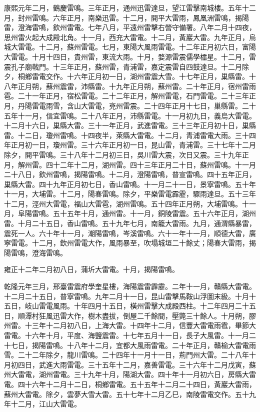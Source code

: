 \begin{pinyinscope}
康熙元年二月，鶴慶雷鳴。三年正月，通州迅雷達旦，望江雷擊南城樓。五年十二月，封州雷鳴。六年正月，南樂迅雷。十二月，開平大雷雨，鳳凰洲雷鳴，揭陽雷，澄海雷鳴，欽州雷電。七年八月，平遠州雷擊右營守備署。八年二月十四夜，思州雷火起大成殿北角。十一月，西充大雷電。十二月，黃巖大雷。九年正月，烏城大雷電。十二月，蘇州雷電。七月，東陽大風雨雷電。十二年正月初六日，富陽大雷電。十月十四日，貴州雷，東流大雨。十月，婺源雷震儒學櫺星。十二月，雷震孔子廟戟門。十三年正月，蘇州雷，青浦雷，嘉定震雷自四鼓達旦。十二月除夕，桐鄉雷電交作。十六年正月初一日，湖州雷震大雪。十七年正月，巢縣雷。十八年正月朔，蘇州震雷，沛縣雷。十九年正月朔，蘇州雷。二十年正月，宿州雷雨雹。二十一年正月，宿松雷電。二十二年正月，解州雷電，石門雷電。二十三年正月，丹陽雷電雨雪，含山大雷電，兗州雷震。二十四年正月十七日，巢縣雷。二十五年十一月，信宜雷鳴。二十八年正月，沛縣雷電。十一月初九日，義烏大雷電。十二月十六日，巢縣大雷。三十一年正月，武進雷電。三十三年正月初十日，巢縣雷。十二日，瓊州雷鳴。十四夜半，萊縣大雷電。十二月，青浦雷電大雨。三十四年正月初一日，瓊州雷。三十六年正月初一日，昆山雷，青浦雷。三十七年十二月除夕，開平雷鳴。三十八年十二月初三日，吳川雷大震，次日又震。三十九年正月，解州雷。四十二年十二月，湖州雷。四十三年正月二十日，蘇州雷鳴。十一月二十八日，欽州雷鳴，揭陽雷鳴。十二月，澄陽雷鳴，普宣雷鳴。四十五年正月，巢縣大雷。四十九年正月初七日，香山雷鳴。十一月二十一日，景寧雷鳴。五十年十一月，大埔雷。十二月，陽春雷鳴。除夕，平樂雷電霹靂，驟雨達旦。五十三年十二月，涇州大雷電，福山大雷雹，湖州雷鳴。五十四年正月朔，大埔雷鳴。十一月，阜陽雷鳴。五十五年十月，通州雷。十一月，銅陵雷震。五十六年正月，湖州雷。十月二十五日，香山雷鳴。五十九年七月，南籠大雷雨。九月，通渭縣暴雷，震死一人。六十年十一月，潮陽雷鳴，岑溪雷鳴。六十一年十一月，順德大雷，廣寧雷電。十二月，欽州雷電大作，風雨暴至，吹塌城垣二十餘丈；陽春大雷雨，揭陽雷鳴，澄海雷鳴。

雍正十二年二月初八日，蒲圻大雷電。十月，揭陽雷鳴。

乾隆元年三月，邢臺雷震府學奎星樓，海陽震雷霹靂。二年十一月，贛縣大雷電。十二月二十五日，普寧雷鳴。九年二月十一日，昆山雷擊馬鞍山浮圖末級。十月十五日，岐山雷電風雨。十年四月十五日，橫州雷擊大成殿西柱。十二年四月二十五日，順潭村狂風迅雷大作，樹木盡拔，倒屋二千餘間，壓斃三十餘人。十月朔，膠州雷。十三年十二月初八日，上海大雷。十四年十二月，信豐大雷電雨雹，畢節大雷電。十六年十月，平度、海鹽震雷。十七年五月十一日，長子大風雷。十一月二十七日，揭陽雷鳴。十八年十二月，宜都大風雨雷電。二十年正月，贛榆大雷電雨雪。二十二年除夕，龍川雷鳴。二十四年十一月十一日，荊門州大雷。二十八年十月初四日，武進大雨雷電。三十五年十二月，嘉善雷電。三十六年十二月戊寅，蘇州大雷電，湖州雷電。三十九年十月，陽湖大雷。四十年十一月初六日，房縣大雷電。四十六年十二月十二日，桐鄉雷電。五十五年十二月二十四日，黃巖大雷雨，蘇州大雷電。除夕，雲夢大雪大雷。五十七年十二月乙巳，南陵雷電交作。五十九年十二月，江山大雷電。


\end{pinyinscope}
